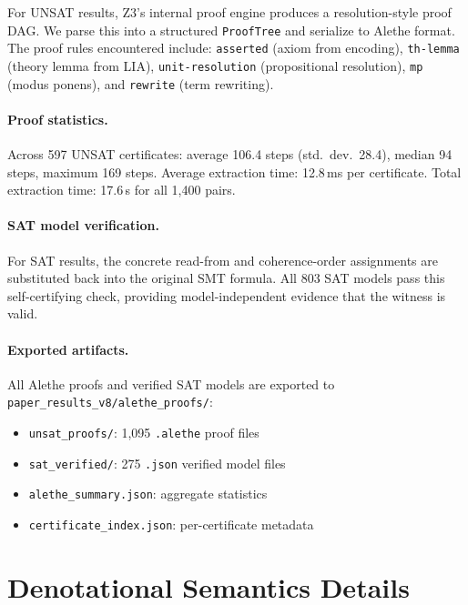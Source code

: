 \documentclass[11pt]{article}
\begin{document}
For UNSAT results, Z3's internal proof engine produces a resolution-style
proof DAG.  We parse this into a structured \texttt{ProofTree} and serialize
to Alethe format.  The proof rules encountered include:
\texttt{asserted} (axiom from encoding), \texttt{th-lemma} (theory lemma
from LIA), \texttt{unit-resolution} (propositional resolution),
\texttt{mp} (modus ponens), and \texttt{rewrite} (term rewriting).

\paragraph{Proof statistics.}
Across 597 UNSAT certificates:
average 106.4 steps (std.\ dev.\ 28.4),
median 94 steps, maximum 169 steps.
Average extraction time: 12.8\,ms per certificate.
Total extraction time: 17.6\,s for all 1{,}400 pairs.

\paragraph{SAT model verification.}
For SAT results, the concrete read-from and coherence-order assignments
are substituted back into the original SMT formula.  All 803 SAT models
pass this self-certifying check, providing model-independent evidence
that the witness is valid.

\paragraph{Exported artifacts.}
All Alethe proofs and verified SAT models are exported to
\texttt{paper\_results\_v8/alethe\_proofs/}:
\begin{itemize}[nosep]
\item \texttt{unsat\_proofs/}: 1{,}095 \texttt{.alethe} proof files
\item \texttt{sat\_verified/}: 275 \texttt{.json} verified model files
\item \texttt{alethe\_summary.json}: aggregate statistics
\item \texttt{certificate\_index.json}: per-certificate metadata
\end{itemize}

\section{Denotational Semantics Details}
\label{app:denotational-details}
\end{document}
